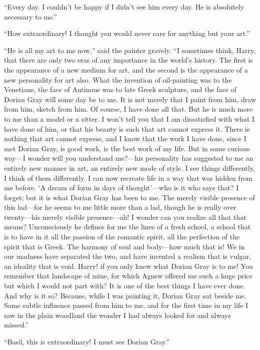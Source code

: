 “Every day. I couldn’t be happy if I didn’t see him every day. He is absolutely necessary to me.”

“How extraordinary! I thought you would never care for anything but your art.”

“He is all my art to me now,” said the painter gravely. “I sometimes think, Harry, that there are only two eras of any importance in the world’s history. The first is the appearance of a new medium for art, and the second is the appearance of a new personality for art also. What the invention of oil-painting was to the Venetians, the face of Antinous was to late Greek sculpture, and the face of Dorian Gray will some day be to me. It is not merely that I paint from him, draw from him, sketch from him. Of course, I have done all that. But he is much more to me than a model or a sitter. I won’t tell you that I am dissatisfied with what I have done of him, or that his beauty is such that art cannot express it. There is nothing that art cannot express, and I know that the work I have done, since I met Dorian Gray, is good work, is the best work of my life. But in some curious way—I wonder will you understand me?—his personality has suggested to me an entirely new manner in art, an entirely new mode of style. I see things differently, I think of them differently. I can now recreate life in a way that was hidden from me before. ‘A dream of form in days of thought’—who is it who says that? I forget; but it is what Dorian Gray has been to me. The merely visible presence of this lad—for he seems to me little more than a lad, though he is really over twenty—his merely visible presence—ah! I wonder can you realize all that that means? Unconsciously he defines for me the lines of a fresh school, a school that is to have in it all the passion of the romantic spirit, all the perfection of the spirit that is Greek. The harmony of soul and body—how much that is! We in our madness have separated the two, and have invented a realism that is vulgar, an ideality that is void. Harry! if you only knew what Dorian Gray is to me! You remember that landscape of mine, for which Agnew offered me such a huge price but which I would not part with? It is one of the best things I have ever done. And why is it so? Because, while I was painting it, Dorian Gray sat beside me. Some subtle influence passed from him to me, and for the first time in my life I saw in the plain woodland the wonder I had always looked for and always missed.”

“Basil, this is extraordinary! I must see Dorian Gray.”

